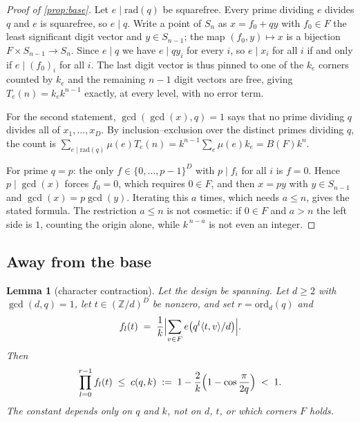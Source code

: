 \documentclass[11pt]{amsart}
\newtheorem{lemma}[theorem]{Lemma}
\theoremstyle{definition}
\theoremstyle{remark}
\begin{document}
\begin{proof}[Proof of \cref{prop:base}]
Let $e \mid \mathrm{rad}(q)$ be squarefree. Every prime dividing $e$ divides $q$ and $e$ is squarefree, so $e \mid q$. Write a point of $S_n$ as $x = f_0 + q y$ with $f_0 \in F$ the least significant digit vector and $y \in S_{n-1}$; the map $(f_0,y) \mapsto x$ is a bijection $F \times S_{n-1} \to S_n$. Since $e \mid q$ we have $e \mid q y_i$ for every $i$, so $e \mid x_i$ for all $i$ if and only if $e \mid (f_0)_i$ for all $i$. The last digit vector is thus pinned to one of the $k_e$ corners counted by $k_e$ and the remaining $n-1$ digit vectors are free, giving $T_e(n) = k_e k^{n-1}$ exactly, at every level, with no error term.

For the second statement, $\gcd(\gcd(x),q)=1$ says that no prime dividing $q$ divides all of $x_1,\dots,x_D$. By inclusion--exclusion over the distinct primes dividing $q$, the count is $\sum_{e \mid \mathrm{rad}(q)} \mu(e) T_e(n) = k^{n-1}\sum_e \mu(e)k_e = B(F)k^n$.

For prime $q=p$: the only $f \in \{0,\dots,p-1\}^{D}$ with $p \mid f_i$ for all $i$ is $f = 0$. Hence $p \mid \gcd(x)$ forces $f_0 = 0$, which requires $0 \in F$, and then $x = py$ with $y \in S_{n-1}$ and $\gcd(x) = p\gcd(y)$. Iterating this $a$ times, which needs $a \le n$, gives the stated formula. The restriction $a \le n$ is not cosmetic: if $0 \in F$ and $a > n$ the left side is $1$, counting the origin alone, while $k^{\,n-a}$ is not even an integer.
\end{proof}

\subsection{Away from the base}

\begin{lemma}[character contraction]
\label{lem:contract}
Let the design be spanning. Let $d \ge 2$ with $\gcd(d,q)=1$, let $t \in (\mathbb{Z}/d)^{D}$ be nonzero, and set $r = \mathrm{ord}_d(q)$ and
\[
  f_l(t) \;=\; \frac{1}{k}\Bigl| \sum_{v \in F} e\bigl(q^{l}\langle t, v\rangle / d\bigr) \Bigr| .
\]
Then
\[
  \prod_{l=0}^{r-1} f_l(t) \;\le\; c(q,k) \;:=\; 1 - \frac{2}{k}\Bigl(1 - \cos\frac{\pi}{2q}\Bigr) \;<\; 1 .
\]
The constant depends only on $q$ and $k$, not on $d$, $t$, or which corners $F$ holds.
\end{lemma}
\end{document}
